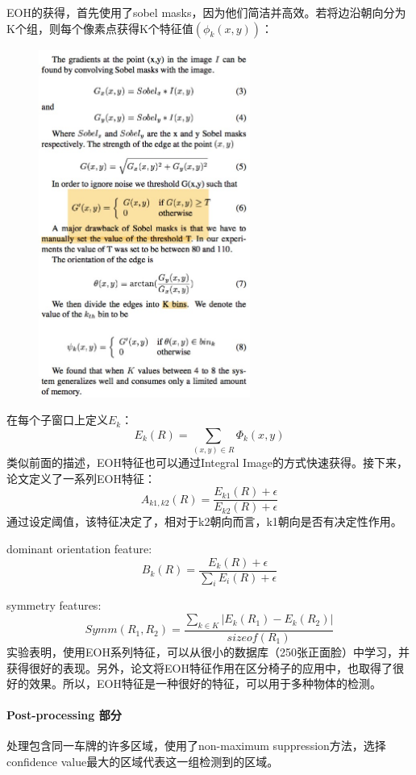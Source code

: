 \begin{enumerate}
EOH的获得，首先使用了sobel masks，因为他们简洁并高效。若将边沿朝向分为K个组，则每个像素点获得K个特征值$(\phi_k(x, y))$：
\begin{figure}[H]
    \centering 
    \includegraphics[width=0.618\textwidth]{image/2_1_4_5.jpg}    
    \label{logic}
\end{figure}
在每个子窗口上定义$E_k$：
$$E_k(R)=\sum_{(x,y)\in R}\Phi_k(x,y)$$
类似前面的描述，EOH特征也可以通过Integral Image的方式快速获得。接下来，论文定义了一系列EOH特征：
$$A_{k1,k2}(R)=\frac{E_{k1}(R)+\epsilon}{E_{k2}(R)+\epsilon}$$
通过设定阈值，该特征决定了，相对于k2朝向而言，k1朝向是否有决定性作用。

dominant orientation feature:
$$B_k(R)=\frac{E_k(R)+\epsilon}{\sum_iE_i(R)+\epsilon}$$

symmetry features: 
$$Symm(R_1,R_2)=\frac{\sum_{k \in K}|E_k(R_1)-E_k(R_2)|}{sizeof(R_1)}$$
实验表明，使用EOH系列特征，可以从很小的数据库（250张正面脸）中学习，并获得很好的表现。另外，论文将EOH特征作用在区分椅子的应用中，也取得了很好的效果。所以，EOH特征是一种很好的特征，可以用于多种物体的检测。
\paragraph{Post-processing 部分}
处理包含同一车牌的许多区域，使用了non-maximum suppression方法，选择confidence value最大的区域代表这一组检测到的区域。

\end{enumerate}
